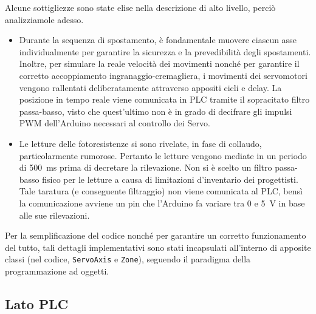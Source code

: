 
Alcune sottigliezze sono state elise nella descrizione di alto livello, perciò analizziamole adesso.
\begin{itemize}
    \item Durante la sequenza di spostamento, è fondamentale muovere ciascun asse individualmente
        per garantire la sicurezza e la prevedibilità degli spostamenti. Inoltre, per simulare la
        reale velocità dei movimenti nonché per garantire il corretto accoppiamento
        ingranaggio-cremagliera, i movimenti dei servomotori vengono rallentati deliberatamente
        attraverso appositi cicli e delay. La posizione in tempo reale viene comunicata in PLC
        tramite il sopracitato filtro passa-basso, visto che quest'ultimo non è in grado di
        decifrare gli impulsi PWM dell'Arduino necessari al controllo dei Servo.
    \item Le letture delle fotoresistenze si sono rivelate, in fase di collaudo, particolarmente
        rumorose. Pertanto le letture vengono mediate in un periodo di \qty{500}{\milli\second}
        prima di decretare la rilevazione. Non si è scelto un filtro passa-basso fisico per le
        letture a causa di limitazioni d'inventario dei progettisti. Tale taratura (e conseguente
        filtraggio) non viene comunicata al PLC, bensì la comunicazione avviene un pin
         che l'Arduino fa variare tra \num{0} e \qty{5}{\volt} in base alle sue
        rilevazioni.
\end{itemize}
Per la semplificazione del codice nonché per garantire un corretto funzionamento del tutto, tali
dettagli implementativi sono stati incapsulati all'interno di apposite classi (nel codice,
\texttt{ServoAxis} e \texttt{Zone}), seguendo il paradigma della programmazione ad oggetti.

\subsection{Lato PLC}

